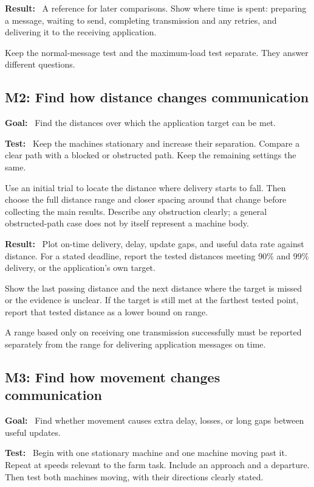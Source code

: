 \documentclass[11pt,a4paper]{article}
\newcommand{\field}[1]{\textbf{#1:}~}
\begin{document}
\field{Result} A reference for later comparisons. Show where time is spent:
preparing a message, waiting to send, completing transmission and any retries,
and delivering it to the receiving application.

Keep the normal-message test and the maximum-load test separate. They answer
different questions.

\subsection{M2: Find how distance changes communication}

\field{Goal} Find the distances over which the application target can be met.

\field{Test} Keep the machines stationary and increase their separation.
Compare a clear path with a blocked or obstructed path. Keep the remaining
settings the same.

Use an initial trial to locate the distance where delivery starts to fall.
Then choose the full distance range and closer spacing around that change
before collecting the main results. Describe any obstruction clearly;
a general obstructed-path case does not by itself represent a machine body.

\field{Result} Plot on-time delivery, delay, update gaps, and useful data rate
against distance. For a stated deadline, report the tested distances meeting
90\% and 99\% delivery, or the application's own target.

Show the last passing distance and the next distance where the target is
missed or the evidence is unclear. If the target is still met at the farthest
tested point, report that tested distance as a lower bound on range.

A range based only on receiving one transmission successfully must be reported
separately from the range for delivering application messages on time.

\subsection{M3: Find how movement changes communication}

\field{Goal} Find whether movement causes extra delay, losses, or long gaps
between useful updates.

\field{Test} Begin with one stationary machine and one machine moving past it.
Repeat at speeds relevant to the farm task. Include an approach and a departure.
Then test both machines moving, with their directions clearly stated.
\end{document}
